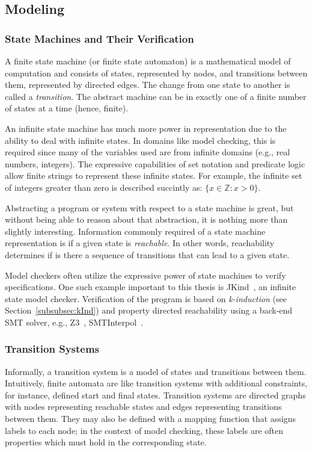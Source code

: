 \subsection{Modeling}
\label{sec:modeling}

\subsubsection{State Machines and Their Verification}
 A finite state machine (or finite state automaton) is a mathematical model of computation and consists of states, represented by nodes, and transitions between them, represented by directed edges. The change from one state to another is called a {\em transition}. The abstract machine can be in exactly one of a finite number of states at a time (hence, finite). 

An infinite state machine has much more power in representation due to the ability to deal with infinite states. In domains like model checking, this is required since many of the variables used are from infinite domains (e.g., real numbers, integers). The expressive capabilities of set notation and predicate logic allow finite strings to represent these infinite states. For example, the infinite set of integers greater than zero is described succintly as: $\{x \in \mathbb{Z} : x > 0\}$. 

Abstracting a program or system with respect to a state machine is great, but without being able to reason about that abstraction, it is nothing more than slightly interesting. Information commonly required of a state machine representation is if a given state is {\em reachable}. In other words, reachability determines if is there a sequence of transitions that can lead to a given state. 

Model checkers often utilize the expressive power of state machines to verify specifications. One such example important to this thesis is JKind~\cite{2017arXiv171201222G}, an infinite state model checker. Verification of the program is based on {\em k-induction} (see Section~\ref{subsubsec:kInd}) and property directed reachability using a back-end SMT solver, e.g., Z3~\cite{z3}, SMTInterpol~\cite{smtInterpol}.

\subsubsection{Transition Systems}
Informally, a transition system is a model of states and transitions between them. Intuitively, finite automata are like transition systems with additional constraints, for instance, defined start and final states. Transition systems are directed graphs with nodes representing reachable states and edges representing transitions between them. They may also be defined with a mapping function that assigns labels to each node; in the context of model checking, these labels are often properties which must hold in the corresponding state.

